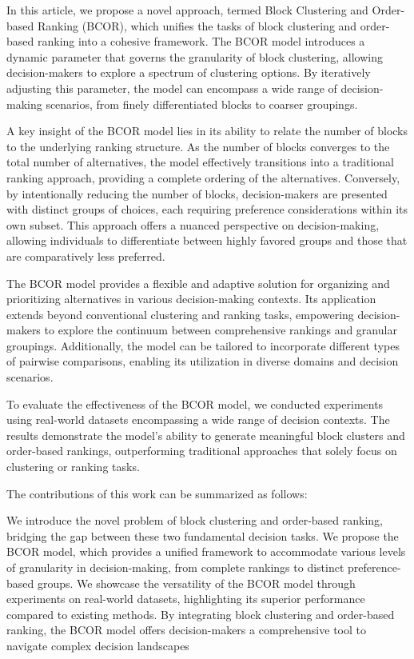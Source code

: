 \documentclass[11pt]{amsart}
\begin{document}
In this article, we propose a novel approach, termed Block Clustering and Order-based Ranking (BCOR), which unifies the tasks of block clustering and order-based ranking into a cohesive framework. The BCOR model introduces a dynamic parameter that governs the granularity of block clustering, allowing decision-makers to explore a spectrum of clustering options. By iteratively adjusting this parameter, the model can encompass a wide range of decision-making scenarios, from finely differentiated blocks to coarser groupings.

A key insight of the BCOR model lies in its ability to relate the number of blocks to the underlying ranking structure. As the number of blocks converges to the total number of alternatives, the model effectively transitions into a traditional ranking approach, providing a complete ordering of the alternatives. Conversely, by intentionally reducing the number of blocks, decision-makers are presented with distinct groups of choices, each requiring preference considerations within its own subset. This approach offers a nuanced perspective on decision-making, allowing individuals to differentiate between highly favored groups and those that are comparatively less preferred.

The BCOR model provides a flexible and adaptive solution for organizing and prioritizing alternatives in various decision-making contexts. Its application extends beyond conventional clustering and ranking tasks, empowering decision-makers to explore the continuum between comprehensive rankings and granular groupings. Additionally, the model can be tailored to incorporate different types of pairwise comparisons, enabling its utilization in diverse domains and decision scenarios.

To evaluate the effectiveness of the BCOR model, we conducted experiments using real-world datasets encompassing a wide range of decision contexts. The results demonstrate the model's ability to generate meaningful block clusters and order-based rankings, outperforming traditional approaches that solely focus on clustering or ranking tasks.

The contributions of this work can be summarized as follows:

We introduce the novel problem of block clustering and order-based ranking, bridging the gap between these two fundamental decision tasks.
We propose the BCOR model, which provides a unified framework to accommodate various levels of granularity in decision-making, from complete rankings to distinct preference-based groups.
We showcase the versatility of the BCOR model through experiments on real-world datasets, highlighting its superior performance compared to existing methods.
By integrating block clustering and order-based ranking, the BCOR model offers decision-makers a comprehensive tool to navigate complex decision landscapes
\end{document}

